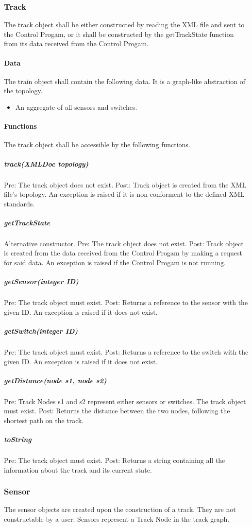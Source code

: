 \documentclass[a4paper,11pt,notitlepage]{article}
\def\CS{Control Progam\xspace}
\def\TN{Track Node\xspace}
\begin{document}
\subsubsection{Track}
The track object shall be either constructed by reading the XML file and sent to the \CS, or it shall be constructed by the getTrackState function from its data received from the \CS.
\paragraph{Data}
The train object shall contain the following data. It is a graph-like abstraction of the topology.
\begin{itemize}
\item An aggregate of all sensors and switches.
\end{itemize}
\paragraph{Functions}
The track object shall be accessible by the following functions.
\subparagraph{track(XMLDoc topology)} Pre: The track object does not exist. Post: Track object is created from the XML file's topology. An exception is raised if it is non-conforment to the defined XML standards.
\subparagraph{getTrackState} Alternative constructor. Pre: The track object does not exist. Post: Track object is created from the data received from the \CS by making a request for said data. An exception is raised if the \CS is not running.
\subparagraph{getSensor(integer ID)} Pre: The track object must exist. Post: Returns a reference to the sensor with the given ID. An exception is raised if it does not exist.
\subparagraph{getSwitch(integer ID)} Pre: The track object must exist. Post: Returns a reference to the switch with the given ID. An exception is raised if it does not exist.
\subparagraph{getDistance(node s1, node s2)} Pre: \TN{}s s1 and s2 represent either sensors or switches. The track object must exist. Post: Returns the distance between the two nodes, following the shortest path on the track.
\subparagraph{toString} Pre: The track object must exist. Post: Returns a string containing all the information about the track and its current state.

\subsubsection{Sensor}
The sensor objects are created upon the construction of a track. They are not constructable by a user. Sensors represent a \TN in the track graph.
\end{document}
